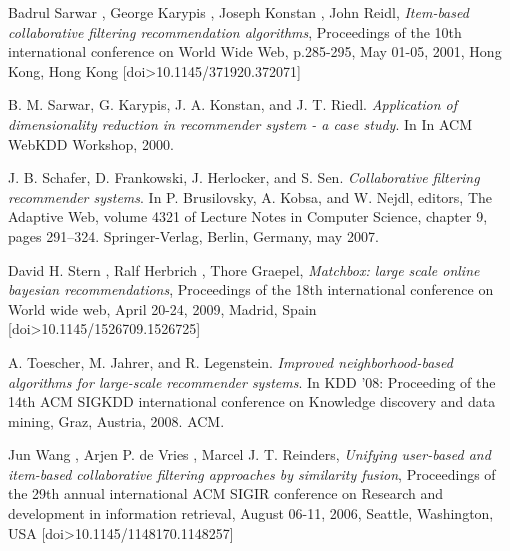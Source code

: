 \documentclass[11pt,letterpaper]{article}
\begin{document}
\begin{thebibliography}{13}
   Badrul Sarwar , George Karypis , Joseph Konstan , John Reidl, \textit{Item-based collaborative filtering recommendation algorithms}, Proceedings of the 10th international conference on World Wide Web, p.285-295, May 01-05, 2001, Hong Kong, Hong Kong  [doi>10.1145/371920.372071]

   B. M. Sarwar, G. Karypis, J. A. Konstan, and J. T. Riedl. \textit{Application of dimensionality reduction in recommender system - a case study}. In In ACM WebKDD Workshop, 2000.

   J. B. Schafer, D. Frankowski, J. Herlocker, and S. Sen. \textit{Collaborative filtering recommender systems}. In P. Brusilovsky, A. Kobsa, and W. Nejdl, editors, The Adaptive Web, volume 4321 of Lecture Notes in Computer Science, chapter 9, pages 291--324. Springer-Verlag, Berlin, Germany, may 2007.

   David H. Stern , Ralf Herbrich , Thore Graepel, \textit{Matchbox: large scale online bayesian recommendations}, Proceedings of the 18th international conference on World wide web, April 20-24, 2009, Madrid, Spain  [doi>10.1145/1526709.1526725]

   A. Toescher, M. Jahrer, and R. Legenstein. \textit{Improved neighborhood-based algorithms for large-scale recommender systems}. In KDD '08: Proceeding of the 14th ACM SIGKDD international conference on Knowledge discovery and data mining, Graz, Austria, 2008. ACM.

   Jun Wang , Arjen P. de Vries , Marcel J. T. Reinders, \textit{Unifying user-based and item-based collaborative filtering approaches by similarity fusion}, Proceedings of the 29th annual international ACM SIGIR conference on Research and development in information retrieval, August 06-11, 2006, Seattle, Washington, USA  [doi>10.1145/1148170.1148257]
\end{thebibliography}
\end{document}
